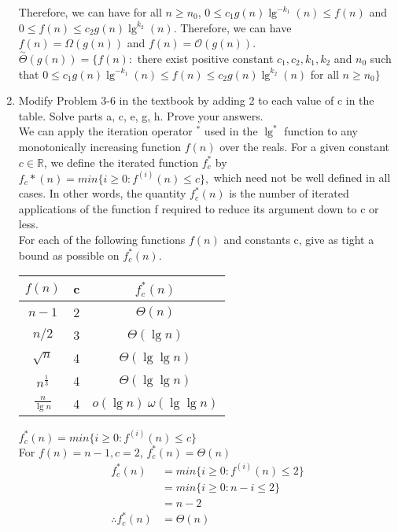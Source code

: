 \documentclass[12pt,letterpaper]{article}
\begin{document}
\begin{enumerate}
Therefore, we can have for all $n \ge n_0$, $ 0 \le c_1 g(n) \lg ^{-k_1} (n) \le f(n) $ and $ 0 \le f(n) \le c_2 g(n) \lg ^{k_2} (n)$. Therefore, we can have $f(n) = \Omega(g(n))$ and $f(n) = \mathcal{O}(g(n))$. \\

$\stackrel{\sim}{\Theta}(g(n)) = \{ f(n):$ there exist positive constant $c_1,c_2, k_1,k_2$ and $n_0$ such that $0 \le c_1 g(n) \lg^{-k_1} (n) \le f(n) \le c_2 g(n) \lg ^{k_2} (n) $ for all $n \ge n_0 \}$\\

\item %
Modify Problem 3-6 in the textbook by adding 2 to each value of c in the table. Solve parts a, c, e, g, h. Prove your answers.\\

We can apply the iteration operator $^*$ used in the $\lg^*$ function to any monotonically increasing function $f(n)$ over the reals. For a given constant $c \in \mathbb{R}$, we define the iterated function $f_c^*$ by \\
$f_c*(n) = min \{ i \ge 0 : f^(i)(n) \le c\},$
which need not be well defined in all cases. In other words, the quantity $f_c^*(n)$ is the number of iterated applications of the function f required to reduce its argument down to c or less. \\
For each of the following functions $f(n)$ and constants c, give as tight a bound as possible on $f_c^*(n)$.\\

\begin{table}
\begin{tabular}[t]{|c|c|c|}
\hline
$f(n)$ & c & $f_c^*(n)$\\
\hline
$n-1$ & 2 & $\Theta(n) $\\
\hline
$n/2$ & 3 & $\Theta(\lg n )$\\
\hline
$\sqrt{n}$ & 4 & $\Theta (\lg \lg n)$\\
\hline
$n ^ \frac{1}{3}$ & 4 & $\Theta (\lg \lg n)$\\
\hline
$\frac{n}{\lg n}$ & 4 & $o(\lg n) \  \omega(\lg \lg n)$\\
\hline
\end{tabular}
\end{table}

$f_c^*(n) = min \{ i \ge 0: f^{(i)}(n) \le c \}$ \\

For $f(n) = n - 1 , c = 2$, $f_c^*(n) = \Theta(n)$
\begin{align*}
f_c^*(n) &= min \{ i \ge 0: f^{(i)}(n) \le 2 \} \\
&= min \{ i \ge 0: n - i \le 2 \} \\
&= n - 2 \\
\therefore f_c^*(n) &= \Theta(n)
\end{align*}


\end{enumerate}
\end{document}
